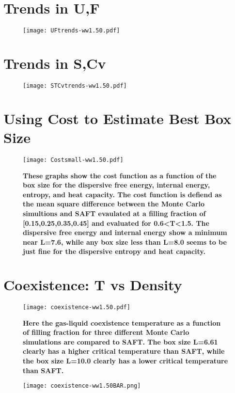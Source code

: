 \section{Trends in U,F}
\begin{figure}[h]
\vspace*{-40mm}
\hspace*{-6mm}
	\centering
	\texttt{[image: UFtrends-ww1.50.pdf]}
	\caption{
	\scriptsize\textbf{
	}}
	\label{fig:UFtrends}
\end{figure}


\pagebreak
\section{Trends in S,Cv}
\begin{figure}[h]
\vspace*{-40mm}
\hspace*{-6mm}
	\centering
	\texttt{[image: STCvtrends-ww1.50.pdf]}
	\caption{\scriptsize\textbf{
	}}
	\label{fig:STCvtrends}
\end{figure}


\pagebreak
\section{Using Cost to Estimate Best Box Size}
\begin{figure}[h]
\vspace*{-10mm}
\hspace*{-6mm}
	\centering
	\texttt{[image: Costsmall-ww1.50.pdf]}
	\caption{\scriptsize\textbf{
	These graphs show the cost function as a function of the box size for the dispersive free energy, internal energy, entropy, and heat capacity. The cost function is defiend as the mean square difference between the Monte Carlo simultions and SAFT evaulated at a filling fraction of [0.15,0.25,0.35,0.45] and evaluated for 0.6\textless T\textless 1.5. The dispersive free energy and internal energy show a minimum near L=7.6, while any box size less than L=8.0 seems to be just fine for the dispersive entropy and heat capacity.}}
	\label{fig:Cost}
\end{figure}
\section{Coexistence: T vs Density}
\begin{figure}[h]
\vspace*{-10mm}
\hspace*{-6mm}
	\centering
	\texttt{[image: coexistence-ww1.50.pdf]}
	\caption{\scriptsize\textbf{
	Here the gas-liquid coexistence temperature as a function of filling fraction for three different Monte Carlo simulations are compared to SAFT. The box size L=6.61 clearly has a higher critical temperature than SAFT, while the box size L=10.0 clearly has a lower critical temperature than SAFT.}}
	\label{fig:Coexistence}
\end{figure}

\begin{figure}[h!]
\vspace*{-64.5mm}
\hspace*{-110mm}
	\centering
	\texttt{[image: coexistence-ww1.50BAR.png]}
\end{figure}



